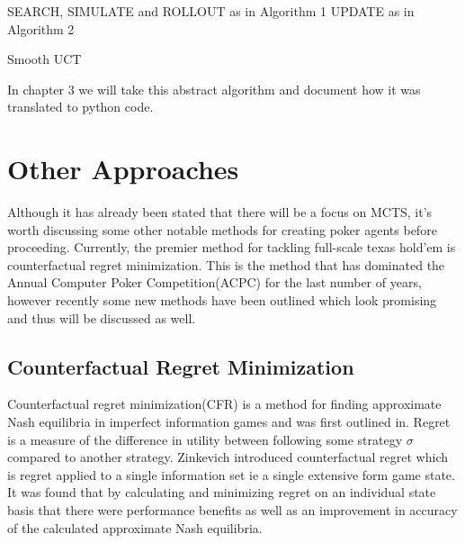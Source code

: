 \begin{algorithm}[H]
    \DontPrintSemicolon
    \LinesNumbered
    SEARCH, SIMULATE and ROLLOUT as in Algorithm 1\;
    UPDATE as in Algorithm 2\;
    \caption{Smooth UCT}
\end{algorithm}

In chapter 3 we will take this abstract algorithm and document how it was translated to
python code.


\section{Other Approaches}\label{sec:thImplementations}
Although it has already been stated that there will be a focus on MCTS,
it's worth discussing some other notable methods for creating poker
agents before proceeding.
Currently, the premier method for tackling full-scale texas hold'em is counterfactual
regret minimization.
This is the method that has dominated the Annual Computer Poker Competition(ACPC) for the
last number of years, however recently some new methods have been outlined
which look promising and thus will be discussed as well.


\subsection{Counterfactual Regret Minimization}\label{subsec:thCFR}
Counterfactual regret minimization(CFR) is a method for finding approximate Nash
equilibria in imperfect information games and was first outlined in\citep{zinkevich2008regret}.
Regret is a measure of the difference in utility between following some strategy
$\sigma$ compared to another strategy.
Zinkevich introduced counterfactual regret which is regret applied to a
single information set ie a single extensive form game state.
It was found that by calculating and minimizing regret on an individual
state basis that there were performance benefits as well as an improvement
in accuracy of the calculated approximate Nash equilibria.


